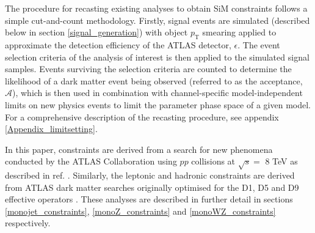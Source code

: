 The procedure for recasting existing \monoX analyses to obtain SiM constraints follows a simple cut-and-count methodology. Firstly, signal events are simulated (described below in section \ref{signal_generation}) with object $p_{\mathrm{T}}$ smearing applied to approximate the detection efficiency of the ATLAS detector, $\epsilon$. The event selection criteria of the \monoX analysis of interest is then applied to the simulated signal samples. Events surviving the selection criteria are counted to determine the likelihood of a dark matter event being observed (referred to as the acceptance, $\mathcal{A}$), which is then used in combination with channel-specific model-independent limits on new physics events to limit the parameter phase space of a given model.
For a comprehensive description of the recasting procedure, see appendix \ref{Appendix_limitsetting}.

In this paper, \monojet constraints are derived from a search for new phenomena conducted by the ATLAS Collaboration using $pp$ collisions at $\sqrt{s}=$ 8 TeV as described in ref. \cite{Aad:2015zva}. Similarly, the leptonic \monoZ and hadronic \monoWZ constraints are derived from ATLAS dark matter searches originally optimised for the D1, D5 and D9 effective operators \cite{Aad:2014monoZlep, ATLASmonoWZ}. These analyses are described in further detail in sections \ref{monojet_constraints}, \ref{monoZ_constraints} and \ref{monoWZ_constraints} respectively.


